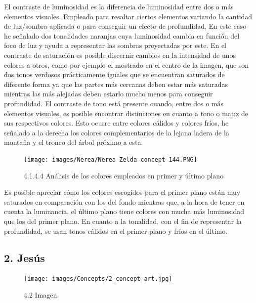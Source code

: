 \documentclass[12pt]{article}
\begin{document}
    El contraste de luminosidad es la diferencia de luminosidad entre dos o más elementos visuales. Empleado para resaltar ciertos elementos variando la cantidad de luz/sombra aplicada o para conseguir un efecto de profundidad, En este caso he señalado dos tonalidades naranjas cuya luminosidad cambia en función del foco de luz y ayuda a representar las sombras proyectadas por este. En el contraste de saturación es posible discernir cambios en la intensidad de unos colores a otros, como por ejemplo el mostrado en el centro de la imagen, que son dos tonos verdosos prácticamente iguales que se encuentran saturados de diferente forma ya que las partes más cercanas deben estar más saturadas mientras las más alejadas deben estarlo mucho menos para conseguir profundidad. El contraste de tono está presente cuando, entre dos o más elementos visuales, es posible encontrar distinciones en cuanto a tono o matiz de sus respectivos colores. Esto ocurre entre colores cálidos y colores fríos, he señalado a la derecha los colores complementarios de la lejana ladera de la montaña y el tronco del árbol próximo a esta.

    \begin{figure}[H]
      \centering
      \texttt{[image: images/Nerea/Nerea Zelda concept 144.PNG]}
      \caption{\small 4.1.4.4 Análisis de los colores empleados en primer y último plano}
    \end{figure}

    Es posible apreciar cómo los colores escogidos para el primer plano están muy saturados en comparación con los del fondo mientras que, a la hora de tener en cuenta la luminancia, el último plano tiene colores con mucha más luminosidad que los del primer plano. En cuanto a la tonalidad, con el fin de representar la profundidad, se usan tonos cálidos en el primer plano y fríos en el último.
        \newpage


    \subsection{2. Jesús}

        \begin{figure}[H]
          \centering
          \texttt{[image: images/Concepts/2\_concept\_art.jpg]}
          \caption{\small{4.2 Imagen}}
        \end{figure}
        
\end{document}
